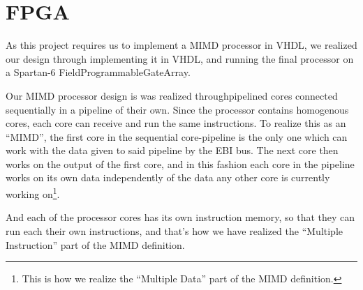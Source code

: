 \FloatBarrier
\chapter{FPGA}\label{chapter:fpga}

As this project requires us to implement a MIMD processor in VHDL, we realized
our design through implementing it in VHDL, and running the final processor on a
Spartan-6 FieldProgrammableGateArray.

Our MIMD processor design is was realized throughpipelined cores connected
sequentially in a pipeline of their own. Since the processor contains homogenous
cores, each core can receive and run the same instructions. To realize this as
an ``MIMD'', the first core in the sequential core-pipeline is the only one which
can work with the data given to said pipeline by the EBI bus. The next core then
works on the output of the first core, and in this fashion each core in the
pipeline works on its own data independently of the data any other core is
currently working on\footnote{This is how we realize the ``Multiple Data'' part
of the MIMD definition.}.

And each of the processor cores has its own instruction memory, so that they can
run each their own instructions, and that's how we have realized the  ``Multiple
Instruction'' part of the MIMD definition.
\newpage







